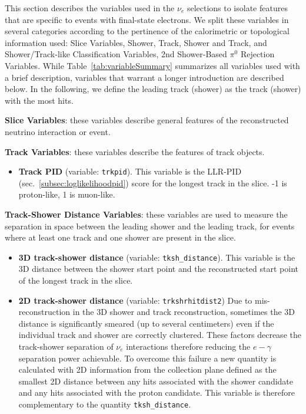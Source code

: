 \par This section describes the variables used in the $\nu_e$ selections to isolate features that are specific to events with final-state electrons. We split these variables in several categories according to the pertinence of the calorimetric or topological information used: Slice Variables, Shower, Track, Shower and Track, and Shower/Track-like  Classification Variables,  2nd Shower-Based $\pi^0$ Rejection Variables.  While Table~\ref{tab:variableSummary} summarizes all variables used with a brief description, variables that warrant a longer introduction are described below. In the following, we define the leading track (shower) as the track (shower) with the most hits.

\par \noindent  \textbf{Slice Variables}: these variables describe general features of the reconstructed neutrino interaction or event.
\par \noindent  \textbf{Track Variables}: these variables describe the features of track objects.
\begin{itemize}
 \item[] \textbf{Track PID} (variable: \texttt{trkpid}).  This variable is the LLR-PID (sec.~\ref{subsec:loglikelihoodpid}) score for the longest track in the slice. -1 is proton-like, 1 is muon-like. 
 \end{itemize}
\par \noindent \textbf{Track-Shower Distance Variables}: these variables are used to measure the separation in space between the leading shower and the leading track, for events where at least one track and one shower are present in the slice. 
\begin{itemize}
 \item[] \textbf{3D track-shower distance} (variable: \texttt{tksh\_distance}).  This variable is the 3D distance between the shower start point and the reconstructed start point of the longest track in the slice. 
 \item[] \textbf{2D track-shower distance} (variable: \texttt{trkshrhitdist2}) Due to mis-reconstruction in the 3D shower and track reconstruction, sometimes the 3D distance is significantly smeared (up to several centimeters) even if the individual track and shower are correctly clustered. These factors decrease the track-shower separation of $\nu_e$ interactions therefore reducing the $e-\gamma$ separation power achievable. To overcome this failure a new quantity is calculated with 2D information from the collection plane defined as the smallest 2D distance between any hits associated with the shower candidate and any hits associated with the proton candidate. This variable is therefore complementary to the quantity \texttt{tksh\_distance}.
\end{itemize}




